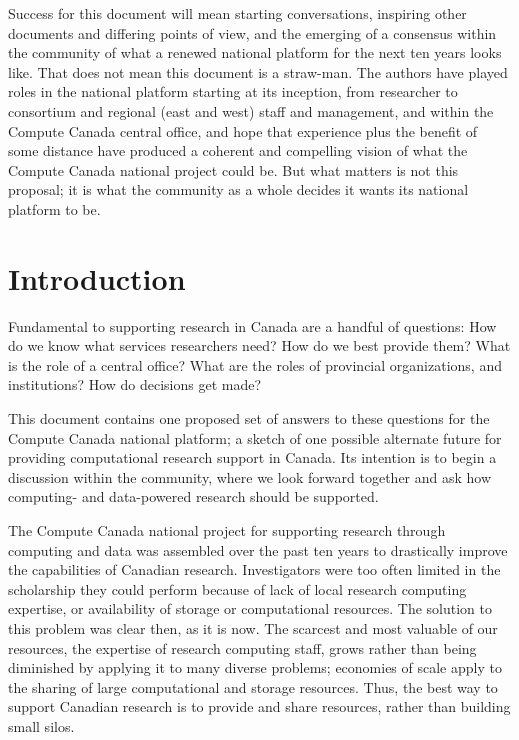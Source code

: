 \documentclass[11pt, letterpaper, twoside]{article}
\begin{document}
\begin{executive}
Success for this document will mean starting conversations, inspiring
other documents and differing points of view, and the emerging of a
consensus within the community of what a renewed national platform for
the next ten years looks like. That does not mean this document is a
straw-man. The authors have played roles in the national platform
starting at its inception, from researcher to consortium and regional
(east and west) staff and management, and within the Compute Canada
central office, and hope that experience plus the benefit of some
distance have produced a coherent and compelling vision of what the
Compute Canada national project could be. But what matters is not this
proposal; it is what the community as a whole decides it wants its
national platform to be.
\end{executive} 

\newpage
\listofproposal
\newpage
\tableofcontents

\cleardoublepage
{}

\section*{Introduction} 
%

Fundamental to supporting research in Canada are a handful of questions:
How do we know what services researchers need? How do we best provide
them? What is the role of a central office? What are the roles of
provincial organizations, and institutions? How do decisions get made?

This document contains one proposed set of answers to these questions
for the Compute Canada national platform; a sketch of one possible
alternate future for providing computational research support in Canada.
Its intention is to begin a discussion within the community, where we
look forward together and ask how computing- and data-powered research
should be supported.

The Compute Canada national project for supporting research through
computing and data was assembled over the past ten years to drastically
improve the capabilities of Canadian research. Investigators were too
often limited in the scholarship they could perform because of lack of
local research computing expertise, or availability of storage or
computational resources. The solution to this problem was clear then, as
it is now.  The scarcest and most valuable of our resources, the
expertise of research computing staff, grows rather than being
diminished by applying it to many diverse problems; economies of scale
apply to the sharing of large computational and storage resources. Thus,
the best way to support Canadian research is to provide and share
resources, rather than building small silos.
\end{document}
